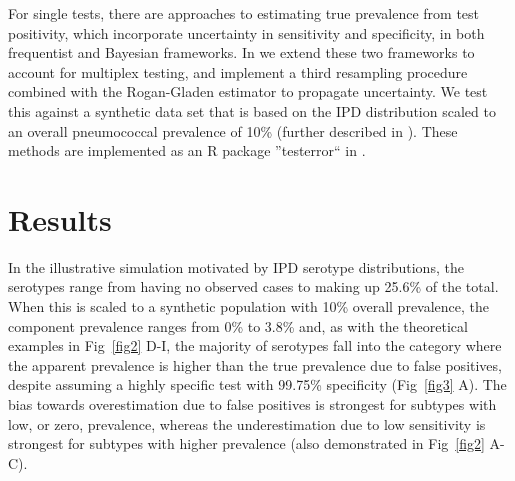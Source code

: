 \documentclass[10pt,letterpaper]{article}
\begin{document}
For single tests, there are approaches to estimating true prevalence from test positivity, which incorporate uncertainty in sensitivity and specificity, in both frequentist\cite{lang2014,thomas2022,flor2020} and Bayesian frameworks\cite{gelman2020,flor2020,diggle2011}. In  we extend these two frameworks to account for multiplex testing, and implement a third resampling procedure combined with the Rogan-Gladen estimator to propagate uncertainty. We test this against a synthetic data set that is based on the IPD distribution scaled to an overall pneumococcal prevalence of 10\% (further described in ). These methods are implemented as an R package ''testerror`` in .

%

\section*{Results}

In the illustrative simulation motivated by IPD serotype distributions, the serotypes range from having no observed cases to making up 25.6\% of the total\cite{hyams2023a}. When this is scaled to a synthetic population with 10\% overall prevalence, the component prevalence ranges from 0\% to 3.8\% and, as with the theoretical examples in Fig~\ref{fig2} D-I, the majority of serotypes fall into the category where the apparent prevalence is higher than the true prevalence due to false positives, despite assuming a highly specific test with 99.75\% specificity (Fig~\ref{fig3} A). The bias towards overestimation due to false positives is strongest for subtypes with low, or zero, prevalence, whereas the underestimation due to low sensitivity is strongest for subtypes with higher prevalence (also demonstrated in Fig~\ref{fig2} A-C). 
\end{document}
